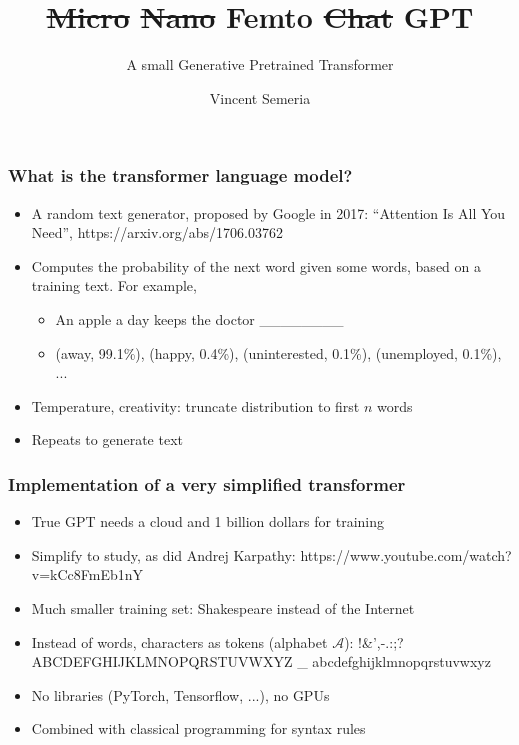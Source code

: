 \documentclass{beamer}
\title{\sout{Micro} \sout{Nano} Femto \sout{Chat} GPT}
\subtitle{A small Generative Pretrained Transformer}
\author{Vincent Semeria}
\begin{document}
\begin{frame}
\titlepage
\end{frame}

\begin{frame}
\frametitle{What is the transformer language model?}

\begin{itemize}
\item A random text generator, proposed by Google in 2017: ``Attention Is All You Need'', https://arxiv.org/abs/1706.03762

\bigskip
\item Computes the probability of the next word given some words, based on a training text. For example,
\begin{itemize}
\item An apple a day keeps the doctor \_\_\_\_\_\_\_\_
\item (away, 99.1\%), (happy, 0.4\%), (uninterested, 0.1\%), (unemployed, 0.1\%), ...
\end{itemize}

\bigskip 
\item Temperature, creativity: truncate distribution to first $n$ words

\bigskip
\item Repeats to generate text
\end{itemize}
\end{frame}

\begin{frame}
\frametitle{Implementation of a very simplified transformer}

\begin{itemize}
\item True GPT needs a cloud and 1 billion dollars for training

\bigskip
\item Simplify to study, as did Andrej Karpathy:  https://www.youtube.com/watch?v=kCc8FmEb1nY

\bigskip
\item Much smaller training set: Shakespeare instead of the Internet

\bigskip
\item Instead of words, characters as tokens (alphabet $\mathcal{A}$):  !\&',-.:;?ABCDEFGHIJKLMNOPQRSTUVWXYZ \_ abcdefghijklmnopqrstuvwxyz

\bigskip
\item No libraries (PyTorch, Tensorflow, ...), no GPUs

\bigskip
\item Combined with classical programming for syntax rules
\end{itemize}
\end{frame}
\end{document}
